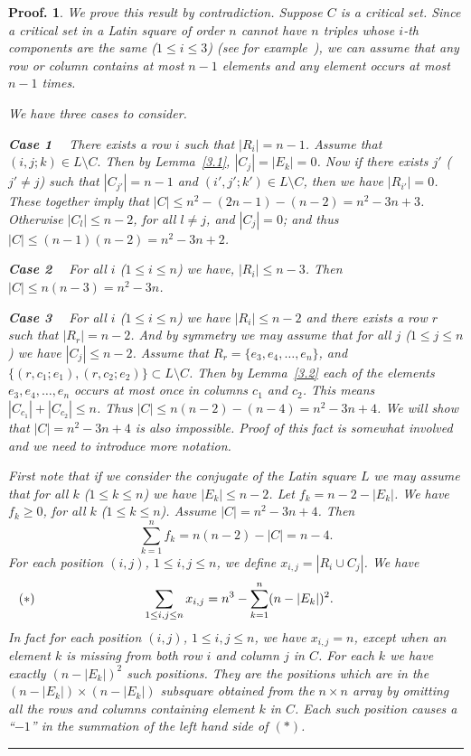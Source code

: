 \documentclass[12pt]{article}
\newtheorem{preproof}{{\bf Proof.}}
\newenvironment{proof}[1]{\begin{preproof}{\rm
               #1}\hfill{\rule[-0.5mm]{2mm}{2mm}}}{\end{preproof}}
\begin{document}
\begin{proof}{
We prove this result by contradiction. Suppose $C$ is a critical set.
Since a critical set in a Latin square of order $n$ cannot have $n$
triples whose $i$-th components are the same ($1 \leq i \leq 3$)
(see for example~{\bf\cite{cv:cs}}),
we can assume that any row or column contains at most $n-1$ elements
and any element occurs at most $n-1$ times.

We have three cases to consider.

\noindent
{\bf Case 1 \ }
There exists a row $i$ such that $|R_{i}| = n-1$. Assume that
$(i,j;k) \in L\setminus C.$
Then by Lemma~\ref{3.1}, $|C_{j}| = |E_{k}| =  0$.
Now if there exists $j'$ ($j' \neq j$) such that $|C_{j'}| = n-1$
and $(i', j'; k') \in L\setminus C$,
then we have $|R_{i'}| = 0$. These together imply that
$|C| \le n^2 - (2n-1)-(n-2)=n^2 - 3n + 3$.  Otherwise
$|C_{l}| \leq n-2$, for all $l \neq j$, and $|C_j| = 0$; and thus
$|C|\leq  (n-1)(n -2)  =  n^2 - 3n + 2$.

\noindent
{\bf Case 2 \ }
For all $i$ ($1\le i \le n$) we have, $|R_{i}| \leq n-3$. Then
$|C| \leq n(n - 3) = n^2 - 3n$.

\noindent
{\bf Case 3 \ } For all $i$ ($1\le i \le n$) we have $|R_i| \leq n-2$ and
there exists a row $r$ such that $|R_{r}| = n-2$.
And by symmetry we may assume that for all $j$ ($1\le j \le n$) we have $|C_j| \leq n-2$.
Assume that $R_r = \{e_{3},e_{4}, \dots, e_{n}\}$,
and $\{(r, c_{1}; e_{1}), (r, c_{2}; e_{2})\}\subset L\setminus C $.
Then by Lemma~\ref{3.2}
each of the elements $e_{3}, e_4, \dots, e_{n}$
occurs at most once in columns $c_{1}$ and $c_{2}$.   This means
$|C_{c_{1}}| + |C_{c_{2}}| \leq n$. Thus
$|C|\leq  n(n -2) -(n -4) =  n^2 - 3n + 4$.
We will show that $|C| =  n^2 - 3n + 4$ is also impossible. Proof of this fact
is somewhat involved and we need to introduce more notation.

First note that if we consider the conjugate of the Latin square $L$
we may assume that for all $k$ ($1\le k \le n$) we have $|E_k| \leq n-2$.
Let  $f_k = n-2 - |E_k|$. We have $f_k \ge 0$, for all $k$ ($1\le k \le n$).
Assume  $|C| = n^2-3n+4$. Then
%
\begin{displaymath}
\sum_{k=1}^{n}
f_k = n(n-2)- |C|= n-4.
\end{displaymath}
For each position $(i,j)$, $1 \leq i,j \leq n$, we define $x_{i,j} = |R_i \cup C_j|$.
We have
\begin{displaymath}
\hspace*{-3.3cm}
(*)
\hspace*{3cm}
\sum_{1 \le i,j \le n}
x_{i,j}= n^3 - \sum_{k=1}^{n}(n-|E_k|)^2.
\end{displaymath}
In fact for each position $(i,j)$, $1 \leq i,j \leq n$, we have $x_{i,j} = n$, except when an
element $k$ is missing from {\it both}
row $i$ and column $j$ in $C$.
For each $k$ we have
exactly $(n-|E_k|)^2$  such positions. They are the positions which are in
the $(n-|E_k|) \times (n-|E_k|)$ subsquare obtained from the $n \times n$
array by omitting all the rows and columns containing element $k$ in $C$.
Each such position causes a ``$-1$'' in the summation of the
left hand side of $(*)$.

}
\end{proof}
\end{document}
